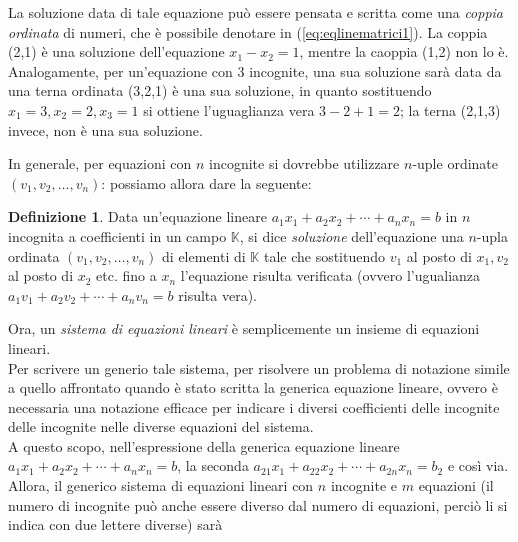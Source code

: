 \documentclass{book}
\theoremstyle{definition}
\newtheorem{defi}{Definizione}[section]
\theoremstyle{plain}
\begin{document}
La soluzione data di tale equazione può essere pensata e scritta
come una \textit{coppia ordinata} di numeri, che è possibile
denotare in (\ref{eq:eqlinematrici1}). La coppia (2,1) è una
soluzione dell'equazione $x_1-x_2=1$, mentre la caoppia (1,2) non
lo è.\\
Analogamente, per un'equazione con 3 incognite, una sua
soluzione sarà data da una terna ordinata (3,2,1) è una sua
soluzione, in quanto sostituendo $x_1=3,x_2=2,x_3=1$ si ottiene
l'uguaglianza vera $3-2+1=2$; la terna (2,1,3) invece, non è una
sua soluzione.

In generale, per equazioni con $n$ incognite si dovrebbe
utilizzare $n$-uple ordinate $(v_1,v_2,\dots,v_n)$: possiamo
allora dare la seguente:
\begin{defi}
  \label{defi:eqlinematrici1}
  Data un'equazione lineare $a_1x_1+a_2x_2+\cdots+a_nx_n=b$ in
  $n$ incognita a coefficienti in un campo $\mathds{K}$, si dice
  \textit{soluzione} dell'equazione una $n$-upla ordinata
  $(v_1,v_2,\dots,v_n)$ di elementi di $\mathds{K}$ tale che
  sostituendo $v_1$ al posto di $x_1,v_2$ al posto di $x_2$ etc.
  fino a $x_n$ l'equazione risulta verificata (ovvero
  l'ugualianza $a_1v_1+a_2v_2+\cdots+a_nv_n=b$ risulta vera).
\end{defi}
Ora, un \textit{sistema di equazioni lineari} è semplicemente un
insieme di equazioni lineari.\\
Per scrivere un generio tale sistema, per risolvere un problema
di notazione simile a quello affrontato quando è stato scritta
la generica equazione lineare, ovvero è necessaria una notazione
efficace per indicare i diversi coefficienti delle incognite
delle incognite nelle diverse equazioni del sistema.\\
A questo scopo, nell'espressione della generica equazione
lineare $a_1x_1+a_2x_2+\cdots+a_nx_n=b$, la seconda $a_{21}x_1+a_{22}x_2+\cdots+a_{2n}x_n=b_2$ e così via.\\
Allora, il generico sistema di equazioni lineari con $n$
incognite e $m$ equazioni (il numero di incognite può anche
essere diverso dal numero di equazioni, perciò li si indica con
due lettere diverse) sarà
\end{document}
